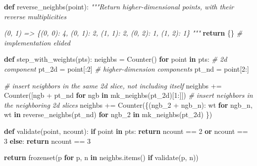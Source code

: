 \documentclass[]{article}
\newenvironment{Shaded}{}{}
\newcommand{\BuiltInTok}[1]{#1}
\newcommand{\CommentTok}[1]{\textcolor[rgb]{0.38,0.63,0.69}{\textit{#1}}}
\newcommand{\ControlFlowTok}[1]{\textcolor[rgb]{0.00,0.44,0.13}{\textbf{#1}}}
\newcommand{\DecValTok}[1]{\textcolor[rgb]{0.25,0.63,0.44}{#1}}
\newcommand{\KeywordTok}[1]{\textcolor[rgb]{0.00,0.44,0.13}{\textbf{#1}}}
\newcommand{\NormalTok}[1]{#1}
\newcommand{\OperatorTok}[1]{\textcolor[rgb]{0.40,0.40,0.40}{#1}}
\begin{document}
\begin{Shaded}
\begin{Highlighting}[]
\KeywordTok{def}\NormalTok{ reverse\_neighbs(point):}
    \CommentTok{"""Return higher{-}dimensional points, with their reverse multiplicities}

\CommentTok{    (0, 1)}
\CommentTok{    => \{(0, 0): 4, (0, 1): 2, (1, 1): 2, (0, 2): 1, (1, 2): 1\}}
\CommentTok{    """}
    \ControlFlowTok{return}\NormalTok{ \{\} }\CommentTok{\# implementation elided}

\KeywordTok{def}\NormalTok{ step\_with\_weights(pts):}
\NormalTok{    neighbs }\OperatorTok{=}\NormalTok{ Counter()}
    \ControlFlowTok{for}\NormalTok{ point }\KeywordTok{in}\NormalTok{ pts:}
        \CommentTok{\# 2d component}
\NormalTok{        pt\_2d }\OperatorTok{=}\NormalTok{ point[:}\DecValTok{2}\NormalTok{]}
        \CommentTok{\# higher{-}dimension components}
\NormalTok{        pt\_nd }\OperatorTok{=}\NormalTok{ point[}\DecValTok{2}\NormalTok{:]}

        \CommentTok{\# insert neighbors in the same 2d slice, not including itself}
\NormalTok{        neighbs }\OperatorTok{+=}\NormalTok{ Counter([ngb }\OperatorTok{+}\NormalTok{ pt\_nd }\ControlFlowTok{for}\NormalTok{ ngb }\KeywordTok{in}\NormalTok{ mk\_neighbs(pt\_2d)[}\DecValTok{1}\NormalTok{:]])}
        \CommentTok{\# insert neighbors in the neighboring 2d slices}
\NormalTok{        neighbs }\OperatorTok{+=}\NormalTok{ Counter(\{(ngb\_2 }\OperatorTok{+}\NormalTok{ ngb\_n): wt}
                                \ControlFlowTok{for}\NormalTok{ ngb\_n, wt }\KeywordTok{in}\NormalTok{ reverse\_neighbs(pt\_nd)}
                                \ControlFlowTok{for}\NormalTok{ ngb\_2 }\KeywordTok{in}\NormalTok{ mk\_neighbs(pt\_2d)}
\NormalTok{                          \})}

    \KeywordTok{def}\NormalTok{ validate(point, ncount):}
        \ControlFlowTok{if}\NormalTok{ point }\KeywordTok{in}\NormalTok{ pts:}
            \ControlFlowTok{return}\NormalTok{ ncount }\OperatorTok{==} \DecValTok{2} \KeywordTok{or}\NormalTok{ ncount }\OperatorTok{==} \DecValTok{3}
        \ControlFlowTok{else}\NormalTok{:}
            \ControlFlowTok{return}\NormalTok{ ncount }\OperatorTok{==} \DecValTok{3}

    \ControlFlowTok{return} \BuiltInTok{frozenset}\NormalTok{(p }\ControlFlowTok{for}\NormalTok{ p, n }\KeywordTok{in}\NormalTok{ neighbs.items() }\ControlFlowTok{if}\NormalTok{ validate(p, n))}
\end{Highlighting}
\end{Shaded}
\end{document}
